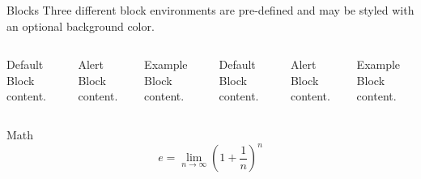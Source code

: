 \documentclass[10pt]{beamer}
\begin{document}
\begin{frame}{Blocks}
  Three different block environments are pre-defined and may be styled with an
  optional background color.

  \begin{columns}[T,onlytextwidth]
      \begin{block}{Default}
        Block content.
      \end{block}

      \begin{alertblock}{Alert}
        Block content.
      \end{alertblock}

      \begin{exampleblock}{Example}
        Block content.
      \end{exampleblock}



      \begin{block}{Default}
        Block content.
      \end{block}

      \begin{alertblock}{Alert}
        Block content.
      \end{alertblock}

      \begin{exampleblock}{Example}
        Block content.
      \end{exampleblock}

  \end{columns}
\end{frame}

\begin{frame}{Math}
  \begin{equation*}
    e = \lim_{n\to \infty} \left(1 + \frac{1}{n}\right)^n
  \end{equation*}
\end{frame}
\end{document}
